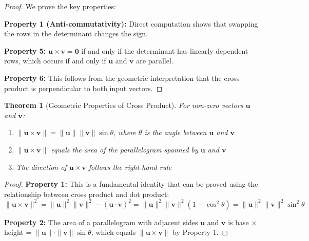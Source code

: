 \documentclass[12pt]{article}
\numberwithin{equation}{section}
\newcommand{\vect}[1]{\boldsymbol{#1}}   %
\theoremstyle{plain}
\newtheorem{theorem}{Theorem}[section]
\theoremstyle{definition}
\theoremstyle{remark}
\begin{document}
\begin{proof}
We prove the key properties:

\textbf{Property 1 (Anti-commutativity):} Direct computation shows that swapping the rows in the determinant changes the sign.

\textbf{Property 5:} $\vect{u} \times \vect{v} = \vect{0}$ if and only if the determinant has linearly dependent rows, which occurs if and only if $\vect{u}$ and $\vect{v}$ are parallel.

\textbf{Property 6:} This follows from the geometric interpretation that the cross product is perpendicular to both input vectors.
\end{proof}

\begin{theorem}[Geometric Properties of Cross Product]
For non-zero vectors $\vect{u}$ and $\vect{v}$:
\begin{enumerate}
\item $\|\vect{u} \times \vect{v}\| = \|\vect{u}\|\|\vect{v}\|\sin\theta$, where $\theta$ is the angle between $\vect{u}$ and $\vect{v}$
\item $\|\vect{u} \times \vect{v}\|$ equals the area of the parallelogram spanned by $\vect{u}$ and $\vect{v}$
\item The direction of $\vect{u} \times \vect{v}$ follows the right-hand rule
\end{enumerate}
\end{theorem}

\begin{proof}
\textbf{Property 1:} This is a fundamental identity that can be proved using the relationship between cross product and dot product:
$$\|\vect{u} \times \vect{v}\|^2 = \|\vect{u}\|^2\|\vect{v}\|^2 - (\vect{u} \cdot \vect{v})^2 = \|\vect{u}\|^2\|\vect{v}\|^2(1 - \cos^2\theta) = \|\vect{u}\|^2\|\vect{v}\|^2\sin^2\theta$$

\textbf{Property 2:} The area of a parallelogram with adjacent sides $\vect{u}$ and $\vect{v}$ is base × height = $\|\vect{u}\| \cdot \|\vect{v}\|\sin\theta$, which equals $\|\vect{u} \times \vect{v}\|$ by Property 1.
\end{proof}
\end{document}
